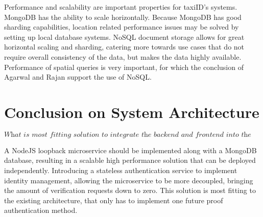 Performance and scalability are important properties for taxiID's systems. MongoDB has the ability to scale horizontally. Because MongoDB has good sharding capabilities, location related performance issues may be solved by setting up local database systems. NoSQL document storage allows for great horizontal scaling and sharding, catering more towards use cases that do not require overall consistency of the data, but makes the data highly available. Performance of spatial queries is very important, for which the conclusion of Agarwal and Rajan support the use of NoSQL.

%
\section{Conclusion on System Architecture}
\[\textit{What is most fitting solution to integrate the backend and frontend into the existing architecture?}\] \hfill

A NodeJS loopback microservice should be implemented along with a MongoDB database, resulting in a scalable high performance solution that can be deployed independently. Introducing a stateless authentication service to implement identity management, allowing the microservice to be more decoupled, bringing the amount of verification requests down to zero. This solution is most fitting to the existing architecture, that only has to implement one future proof authentication method.
